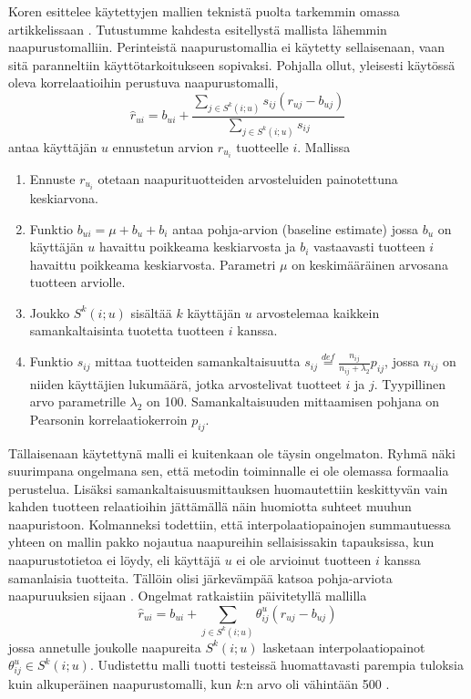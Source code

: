 \documentclass[12pt,finnish]{tktltiki2}
\theoremstyle{definition}
\theoremstyle{remark}
\begin{document}
	Koren esittelee käytettyjen mallien teknistä puolta tarkemmin omassa artikkelissaan \cite{Koren:2008:FMN:1401890.1401944}. Tutustumme kahdesta esitellystä mallista lähemmin naapurustomalliin. Perinteistä naapurustomallia ei käytetty sellaisenaan, vaan sitä paranneltiin käyttötarkoitukseen sopivaksi. Pohjalla ollut, yleisesti käytössä oleva korrelaatioihin perustuva naapurustomalli,
\begin{displaymath}
\hat{r}_{ui} = b_{ui} + \frac{\sum_{j\in S^{k}(i;u)} s_{ij}(r_{uj}-b_{uj})}{\sum_{j \in S^{k} (i;u)}s_{ij} }
\end{displaymath}         
antaa käyttäjän $u$ ennustetun arvion $r_{u_{i}}$ tuotteelle $i$. Mallissa
\begin{enumerate}
\item Ennuste $r_{u_{i}}$ otetaan naapurituotteiden arvosteluiden painotettuna keskiarvona.
\item Funktio $b_{ui} = \mu + b_u + b_i$ antaa pohja-arvion (baseline estimate) jossa $b_u$ on käyttäjän $u$ havaittu poikkeama keskiarvosta ja $b_i$ vastaavasti tuotteen $i$ havaittu poikkeama keskiarvosta. Parametri $\mu$ on keskimääräinen arvosana tuotteen arviolle.
\item Joukko $S^k (i;u)$ sisältää $k$ käyttäjän $u$ arvostelemaa kaikkein samankaltaisinta tuotetta tuotteen $i$ kanssa.
\item Funktio $s_{ij}$ mittaa tuotteiden samankaltaisuutta $s_{ij} \stackrel{def}{=} \frac{n_{ij}}{n_{ij} + \lambda_2} p_{ij}$, jossa $n_{ij}$ on niiden käyttäjien lukumäärä, jotka arvostelivat tuotteet $i$ ja $j$. Tyypillinen arvo parametrille $\lambda_2$ on 100. Samankaltaisuuden mittaamisen pohjana on Pearsonin korrelaatiokerroin $p_{ij}$.
\end{enumerate} 

Tällaisenaan käytettynä malli ei kuitenkaan ole täysin ongelmaton. Ryhmä näki suurimpana ongelmana sen, että metodin toiminnalle ei ole olemassa formaalia perustelua. Lisäksi samankaltaisuusmittauksen huomautettiin keskittyvän vain kahden tuotteen relaatioihin jättämällä näin huomiotta suhteet muuhun naapuristoon. Kolmanneksi todettiin, että interpolaatiopainojen summautuessa yhteen on mallin pakko nojautua naapureihin sellaisissakin tapauksissa, kun naapurustotietoa ei löydy, eli käyttäjä $u$ ei ole arvioinut tuotteen $i$ kanssa samanlaisia tuotteita. Tällöin olisi järkevämpää katsoa pohja-arviota naapuruuksien sijaan \cite{Koren:2008:FMN:1401890.1401944}.
Ongelmat ratkaistiin päivitetyllä mallilla
\begin{displaymath}
\hat{r}_{ui} = b_{ui} + \sum_{j\in{S^{k}} (i;u)}\theta^{u}_{ij}(r_{uj}-b_{uj})
\end{displaymath}
jossa annetulle joukolle naapureita $S^{k}(i;u)$ lasketaan interpolaatiopainot $\theta^{u}_{ij} \in S^{k}(i;u)$. Uudistettu malli tuotti testeissä huomattavasti parempia tuloksia kuin alkuperäinen naapurustomalli, kun $k$:n arvo oli vähintään 500 \cite{Koren:2008:FMN:1401890.1401944}.
                
\end{document}
